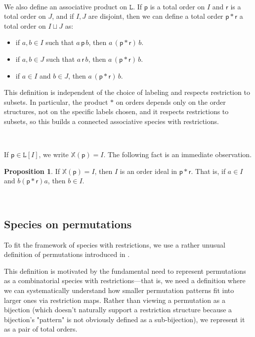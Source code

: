 \documentclass[12pt, reqno]{amsart}
\theoremstyle{definition}
\newtheorem{prop}[thm]{Proposition}
\begin{document}
\

We also define an associative product on $\mathtt{L}$.
If $\mathsf{p}$ is a total order on $I$ and $\mathsf{r}$ is a total order on $J$, and if $I, J$ are disjoint, then we can define a total order $\mathsf{p} \ast\mathsf{r}$ a total order on $I \sqcup J$ as:

\begin{itemize}
\item if $a, b \in I$ such that $a \, \mathsf{p} \, b$, then $a \, (\mathsf{p} \ast \mathsf{r}) \, b$.

\item if $a, b \in J$ such that $a \, \mathsf{r} \, b$, then $a \, (\mathsf{p} \ast \mathsf{r}) \, b$.

\item if $a \in I$ and $b \in J$, then $a \, (\mathsf{p} \ast \mathsf{r}) \, b$.
\end{itemize}
This definition is independent of the choice of labeling and respects restriction to subsets. In particular, the product $\ast$ on orders depends only on the order structures, not on the specific labels chosen, and it respects restrictions to subsets, so this builds a connected associative species with restrictions. 

\

If $\mathsf{p} \in \mathtt{L}[I]$, we write $\mathbb{X}(\mathsf{p}) = I$.
The following fact is an immediate observation.

\begin{prop}\label{prop:linorderideals}
If $\mathbb{X}(\mathsf{p}) = I$, then $I$ is an order ideal in $\mathsf{p} \ast \mathsf{r}$.
That is, if $a\in I$ and $b (\mathsf{p} \ast \mathsf{r}) a$, then $b\in I$.
\end{prop}

\

\subsection{Species on permutations\label{sec:speciespermutation}}

To fit the framework of species with restrictions, we use a rather unusual definition of permutations introduced in \cite{albert2020two}.

This definition is motivated by the fundamental need to represent permutations as a combinatorial species with restrictions—that is, we need a definition where we can systematically understand how smaller permutation patterns fit into larger ones via restriction maps. Rather than viewing a permutation as a bijection (which doesn't naturally support a restriction structure because a bijection's "pattern" is not obviously defined as a sub-bijection), we represent it as a pair of total orders.
\end{document}
